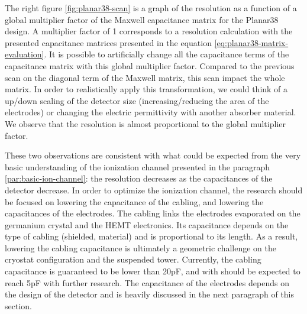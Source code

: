 
The right figure \ref{fig:planar38-scan} is a graph of the resolution as a function of a global multiplier factor of the Maxwell capacitance matrix for the Planar38 design. A multiplier factor of 1 corresponds to a resolution calculation with the presented capacitance matrices presented in the equation \ref{eq:planar38-matrix-evaluation}. It is possible to artificially change all the capacitance terms of the capacitance matrix with this global multiplier factor. Compared to the previous scan on the diagonal term of the Maxwell matrix, this scan impact the whole matrix. In order to realistically apply this transformation, we could think of a up/down scaling of the detector size (increasing/reducing the area of the electrodes) or changing the electric permittivity with another absorber material. We observe that the resolution is almost proportional to the global multiplier factor.

These two observations are consistent with what could be expected from the very basic understanding of the ionization channel presented in the paragraph \ref{par:basic-ion-channel}: the resolution decreases as the capacitances of the detector decrease. 
In order to optimize the ionization channel, the research should be focused on lowering the capacitance of the cabling, and lowering the capacitances of the electrodes.
The cabling links the electrodes evaporated on the germanium crystal and the HEMT electronics. Its capacitance depends on the type of cabling (shielded, material) and is proportional to its length. As a result, lowering the cabling capacitance is ultimately a geometric challenge on the cryostat configuration and the suspended tower. Currently, the cabling capacitance is guaranteed to be lower than 20pF, and with should be expected to reach 5pF with further research.
The capacitance of the electrodes depends on the design of the detector and is heavily discussed in the next paragraph of this section.

